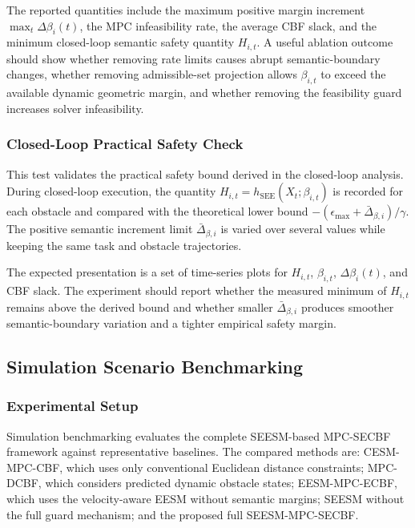 \documentclass[journal]{IEEEtranTIE}
\begin{document}
    The reported quantities include the maximum positive margin increment
    $\max_t\Delta\beta_i(t)$, the MPC infeasibility rate, the average CBF slack,
    and the minimum closed-loop semantic safety quantity $H_{i,t}$. A useful
    ablation outcome should show whether removing rate limits causes abrupt
    semantic-boundary changes, whether removing admissible-set projection allows
    $\beta_{i,t}$ to exceed the available dynamic geometric margin, and whether
    removing the feasibility guard increases solver infeasibility.

    \subsubsection{Closed-Loop Practical Safety Check}
    This test validates the practical safety bound derived in the closed-loop
    analysis. During closed-loop execution, the quantity
    $H_{i,t}=h_{\mathrm{SEE}}(X_t;\beta_{i,t})$ is recorded for each obstacle and
    compared with the theoretical lower bound
    $-(\epsilon_{\max}+\bar{\Delta}_{\beta,i})/\gamma$. The positive semantic
    increment limit $\bar{\Delta}_{\beta,i}$ is varied over several values while
    keeping the same task and obstacle trajectories.

    The expected presentation is a set of time-series plots for $H_{i,t}$,
    $\beta_{i,t}$, $\Delta\beta_i(t)$, and CBF slack. The experiment should
    report whether the measured minimum of $H_{i,t}$ remains above the derived
    bound and whether smaller $\bar{\Delta}_{\beta,i}$ produces smoother
    semantic-boundary variation and a tighter empirical safety margin.

    \subsection{Simulation Scenario Benchmarking}
    \label{E_simulation-section}

    \subsubsection{Experimental Setup}
    Simulation benchmarking evaluates the complete SEESM-based MPC-SECBF
    framework against representative baselines. The compared methods are:
    CESM-MPC-CBF, which uses only conventional Euclidean distance constraints;
    MPC-DCBF, which considers predicted dynamic obstacle states; EESM-MPC-ECBF,
    which uses the velocity-aware EESM without semantic margins; SEESM without
    the full guard mechanism; and the proposed full SEESM-MPC-SECBF.
\end{document}
